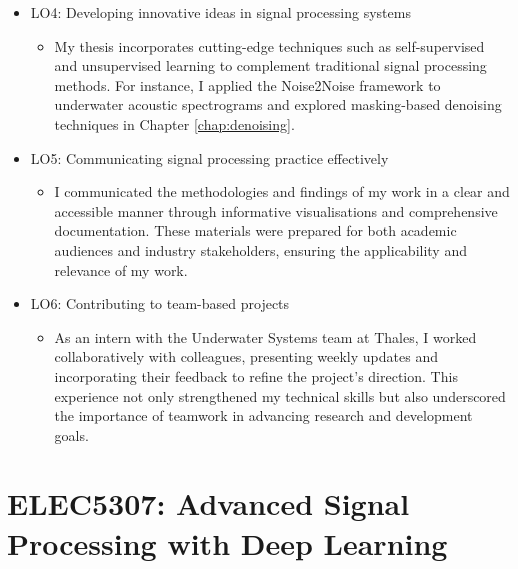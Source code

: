 \begin{itemize}
\begin{itemize}
    \end{itemize}
    \item LO4: Developing innovative ideas in signal processing systems
    \begin{itemize}
        \item My thesis incorporates cutting-edge techniques such as self-supervised and unsupervised learning to complement traditional signal processing methods. For instance, I applied the Noise2Noise framework to underwater acoustic spectrograms and explored masking-based denoising techniques in Chapter \ref{chap:denoising}.
    \end{itemize}
    \item LO5: Communicating signal processing practice effectively
    \begin{itemize}
        \item I communicated the methodologies and findings of my work in a clear and accessible manner through informative visualisations and comprehensive documentation. These materials were prepared for both academic audiences and industry stakeholders, ensuring the applicability and relevance of my work.
    \end{itemize}
    \item LO6: Contributing to team-based projects
    \begin{itemize}
        \item As an intern with the Underwater Systems team at Thales, I worked collaboratively with colleagues, presenting weekly updates and incorporating their feedback to refine the project's direction. This experience not only strengthened my technical skills but also underscored the importance of teamwork in advancing research and development goals.
    \end{itemize}
\end{itemize}

\section{ELEC5307: Advanced Signal Processing with Deep Learning}

